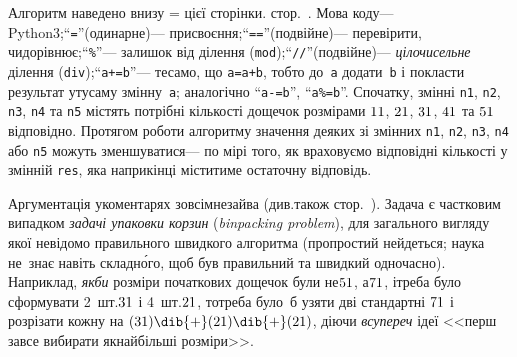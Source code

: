 
Алгоритм наведено внизу\label{text:201314-oioi-B-parket-ref}
\ifnum{}=%
цієї сторінки.
\else%
стор.~\pageref{fig:parket-algorithm}.
\fi%
Мова коду\nolinebreak[3] --- Python3;\hspace{0.5em plus 1em}\linebreak[1]
``\verb"="''\nolinebreak[3] (одинарне)\nolinebreak[3] --- присвоєння;\hspace{0.5em plus 1em}\linebreak[1]
``\verb"=="''\nolinebreak[3] (подвійне)\nolinebreak[3] --- перевірити, чи\nolinebreak[3] дорівнює;\hspace{0.5em plus 1em}\linebreak[1]
``\verb"%"''\nolinebreak[3] --- залишок від ділення (\texttt{mod});\hspace{0.5em plus 1em}\linebreak[1]
``\verb"//"''\nolinebreak[3] (подвійне)\nolinebreak[3] --- \emph{цілочисельне} ділення (\texttt{div});\hspace{0.5em plus 1em}\linebreak[1]
``\verb"a+=b"''\nolinebreak[3] --- те\nolinebreak[2] само, що \verb"a=a+b", тобто до~\verb"a" додати~\verb"b" і покласти результат у\nolinebreak[1] ту\nolinebreak[2] саму змінну~\verb"a"; аналогічно ``\verb"a-=b"'', ``\verb"a%=b"''.
Спочатку, змінні \texttt{n1}, \texttt{n2}, \texttt{n3}, \texttt{n4} та \texttt{n5} містять потрібні кількості дощечок розмірами $1{\*}1$, $2{\*}1$, $3{\*}1$, $4{\*}1$ та $5{\*}1$ відповідно. %
Протягом роботи алгоритму значення деяких зі змінних \texttt{n1}, \texttt{n2}, \texttt{n3}, \texttt{n4} або \texttt{n5} можуть зменшуватися\nolinebreak[3] --- по мірі того, як враховуємо відповідні кількості у змінній \texttt{res}, яка наприкінці міститиме остаточну відповідь. 

Аргументація %
у\nolinebreak[3] коментарях зовсім\nolinebreak[1] не\nolinebreak[3] зайва
(див.\nolinebreak[2] також стор.~\pageref{text:need-or-no-need-to-prove}). 
Задача є частковим випадком \emph{задачі упаковки корзин} (\emph{bin\nolinebreak[1] packing problem}), для загального вигляду якої не\nolinebreak[3] відомо правильного швидкого алгоритма (про\nolinebreak[1] простий не\nolinebreak[3] йдеться; наука не~знає навіть складн\'{о}го, щоб був правильний та швидкий одночасно). Наприклад, \emph{якби} розміри початкових дощечок були не\nolinebreak[3] $5{\*}1$, а\nolinebreak[3] $7{\*}1$, і\nolinebreak[3] треба було сформувати 2~шт.\nolinebreak[3] $3{\*}1$ і 4~шт.\nolinebreak[3] $2{\*}1$, то\nolinebreak[3] треба було~б узяти дві стандартні $7{\*}1$ і розрізати кожну на $(3{\*}1)\dib{{+}}(2{\*}1)\dib{{+}}(2{\*}1)$, діючи \emph{всупереч} ідеї <<перш за\nolinebreak[3] все вибирати якнайбільші розміри>>.

